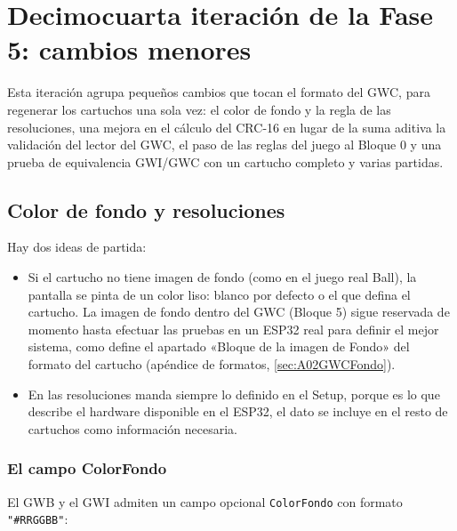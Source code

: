 \section{Decimocuarta iteración de la Fase 5: cambios menores}
\label{sec:F5I14}

Esta iteración agrupa pequeños cambios que tocan el formato del GWC, para regenerar los cartuchos una sola vez: el color de fondo y la regla de las resoluciones, una mejora en el cálculo del CRC-16 en lugar de la suma aditiva la validación del lector del GWC, el paso de las reglas del juego al Bloque 0 y una prueba de equivalencia GWI/GWC con un cartucho completo y varias partidas. 

\subsection{Color de fondo y resoluciones}
\label{sec:F5I14Fondo}

Hay dos ideas de partida:

\begin{itemize}
	\item Si el cartucho no tiene imagen de fondo (como en el juego real Ball), la pantalla se pinta de un color liso: blanco por defecto o el que defina el cartucho. La imagen de fondo dentro del GWC (Bloque 5) sigue reservada de momento hasta efectuar las pruebas en un ESP32 real para definir el mejor sistema, como define el apartado «Bloque de la imagen de Fondo» del formato del cartucho (apéndice de formatos, \ref{sec:A02GWCFondo}).

	\item En las resoluciones manda siempre lo definido en el Setup, porque es lo que describe el hardware disponible en el ESP32, el dato se incluye en el resto de cartuchos como información necesaria.
\end{itemize}

\subsubsection{El campo ColorFondo}

El GWB y el GWI admiten un campo opcional \texttt{ColorFondo} con formato \texttt{"\#RRGGBB"}:

